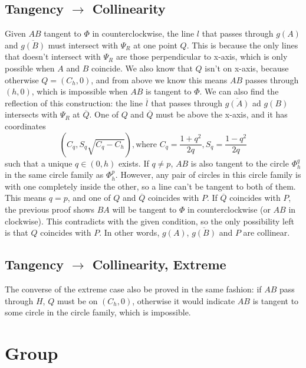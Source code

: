 \documentclass[]{article}
\begin{document}
\subsection{Tangency $\to$ Collinearity}
Given $AB$ tangent to $\Phi$ in counterclockwise, the line $l$ that passes through $g(A)$ and $\overline{g(B)}$ must intersect with $\Psi_R$ at one point $Q$. This is because the only lines that doesn't intersect with $\Psi_R$ are those perpendicular to x-axis, which is only possible when $A$ and $B$ coincide. We also know that $Q$ isn't on x-axis, because otherwise $Q = (C_h, 0)$, and from above we know this means $AB$ passes through $(h, 0)$, which is impossible when $AB$ is tangent to $\Phi$. We can also find the reflection of this construction: the line $\overline{l}$ that passes through $\overline{g(A)}$ ad $g(B)$ intersects with $\Psi_R$ at $\overline{Q}$. One of $Q$ and $\overline{Q}$ must be above the x-axis, and it has coordinates
\[
(C_q, S_q\sqrt{C_q-C_h}), \mbox{where } C_q = \frac{1+q^2}{2q}, S_q = \frac{1-q^2}{2q}
\]
such that a unique $q \in (0, h)$ exists. If $q \neq p$, $AB$ is also tangent to the circle $\Phi_{h}^{q}$ in the same circle family as $\Phi_{h}^{p}$. However, any pair of circles in this circle family is with one completely inside the other, so a line can't be tangent to both of them. This means $q = p$, and one of $Q$ and $\overline{Q}$ coincides with $P$. If $\overline{Q}$ coincides with $P$, the previous proof shows $BA$ will be tangent to $\Phi$ in counterclockwise (or $AB$ in clockwise). This contradicts with the given condition, so the only possibility left is that $Q$ coincides with $P$. In other words, $g(A)$, $\overline{g(B)}$ and $P$ are collinear.

\subsection{Tangency $\to$ Collinearity, Extreme}
The converse of the extreme case also be proved in the same fashion: if $AB$ pass through $H$, $Q$ must be on $(C_h, 0)$, otherwise it would indicate $AB$ is tangent to some circle in the circle family, which is impossible.

\section{Group}
\end{document}
